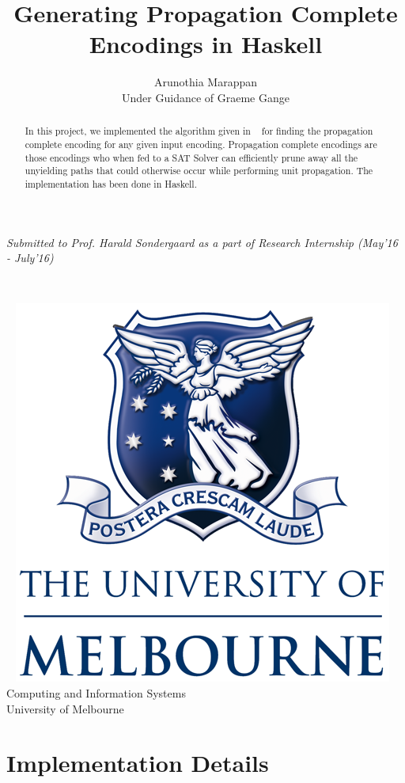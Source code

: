 \documentclass{article}
\title{Generating Propagation Complete Encodings in Haskell \\ }
\author{\vspace{2mm} \large Arunothia Marappan \\ Under Guidance of Graeme Gange }
\date{}
\theoremstyle{plain}
\begin{document}
\maketitle
\begin{center}
\emph{Submitted to Prof. Harald Sondergaard as a part of Research Internship (May'16 - July'16)}
\end{center}
\vspace*{2cm}~

\begin{abstract}
 In this project, we implemented the algorithm given in ~\cite{PCE} for finding the propagation complete encoding for any given input encoding. Propagation complete encodings are those encodings who when fed to a SAT Solver can efficiently prune away all the unyielding paths that could otherwise occur while performing unit propagation. The implementation has been done in Haskell.  
\end{abstract}

\begin{center}
\vspace*{7cm}~ \includegraphics[scale=1]{UOM.png} \\
\large{Computing and Information Systems \\ University of Melbourne}
\end{center}
\newpage
\section{Implementation Details} 
\end{document}
